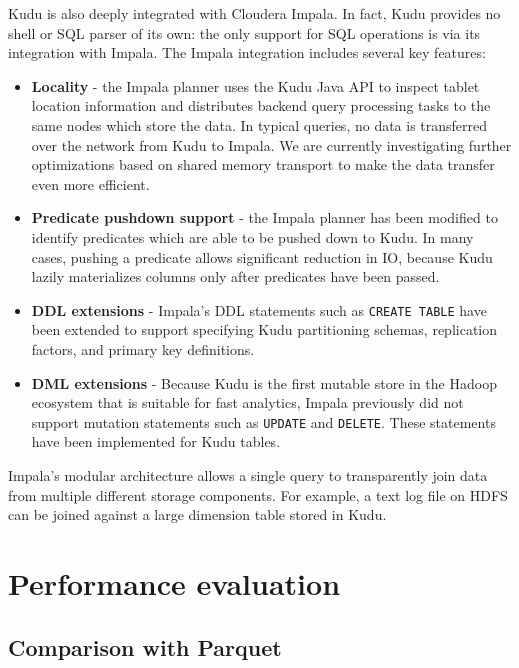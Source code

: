 \documentclass[twocolumn,9pt]{article}
\begin{document}
Kudu is also deeply integrated with Cloudera Impala\cite{impala}. In fact, Kudu provides
no shell or SQL parser of its own: the only support for SQL operations is via its integration
with Impala. The Impala integration includes several key features:
\begin{itemize}
\item {\bf Locality} - the Impala planner uses the Kudu Java API to inspect tablet location
information and distributes backend query processing tasks to the same nodes which store the
data. In typical queries, no data is transferred over the network from Kudu to Impala. We
are currently investigating further optimizations based on shared memory transport to
make the data transfer even more efficient.

\item {\bf Predicate pushdown support} - the Impala planner has been modified to identify
predicates which are able to be pushed down to Kudu. In many cases, pushing a predicate
allows significant reduction in IO, because Kudu lazily materializes columns only after predicates
have been passed.

\item {\bf DDL extensions } - Impala's DDL statements such as {\tt CREATE TABLE} have been
extended to support specifying Kudu partitioning schemas, replication factors, and primary
key definitions.

\item {\bf DML extensions } - Because Kudu is the first mutable store in the Hadoop ecosystem that
is suitable for fast analytics, Impala previously did not support mutation statements such as
{\tt UPDATE} and {\tt DELETE}. These statements have been implemented for Kudu tables.
\end{itemize}

Impala's modular architecture allows a single query to transparently join data from
multiple different storage components. For example, a text log file on HDFS can be joined against
a large dimension table stored in Kudu.

\section{Performance evaluation}
\label{sec:benchmarks}

\subsection{Comparison with Parquet}
\end{document}
